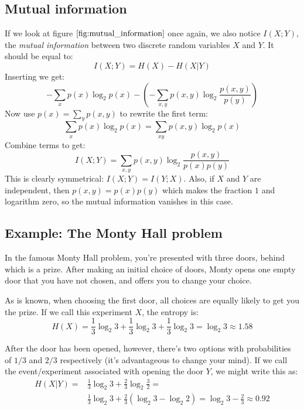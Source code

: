 \documentclass[12pt, a4paper]{article}
\numberwithin{equation}{section}
\begin{document}
\subsection{Mutual information}
If we look at figure $\ref{fig:mutual_information}$ once again, we also notice $I(X;Y)$, the \textit{mutual information} between two discrete random variables $X$ and $Y$. It should be equal to:
\begin{equation}
I(X;Y)=H(X)-H(X|Y)
\end{equation}
Inserting we get:
\begin{equation}
-\sum_x p(x)\log_2 p(x)-\left(-\sum_{x,y}p(x,y)\log_2\frac{p(x,y)}{p(y)}\right)
\end{equation}
Now use $p(x)=\sum_y p(x,y)$ to rewrite the first term:
\begin{equation}
\sum_x p(x)\log_2 p(x)=\sum_{xy}p(x,y)\log_2 p(x)
\end{equation}
Combine terms to get:
\begin{equation}
\label{mutual_information}
I(X;Y)=\sum_{x,y}p(x,y)\log_2\frac{p(x,y)}{p(x)p(y)}
\end{equation}
This is clearly symmetrical: $I(X;Y)=I(Y;X)$. Also, if $X$ and $Y$ are independent, then $p(x,y)=p(x)p(y)$ which makes the fraction $1$ and logarithm zero, so the mutual information vanishes in this case.

\subsection{Example: The Monty Hall problem}
In the famous Monty Hall problem, you're presented with three doors, behind which is a prize. After making an initial choice of doors, Monty opens one empty door that you have not chosen, and offers you to change your choice.

As is known, when choosing the first door, all choices are equally likely to get you the prize. If we call this experiment $X$, the entropy is:
\begin{equation}
H(X)=\frac{1}{3}\log_2 3+\frac{1}{3}\log_2 3+\frac{1}{3}\log_2 3=\log_2 3\approx 1.58
\end{equation}

After the door has been opened, however, there's two options with probabilities of $1/3$ and $2/3$ respectively (it's advantageous to change your mind). If we call the event/experiment associated with opening the door $Y$, we might write this as:
\begin{align}
H(X|Y)=&\frac{1}{3}\log_2 3+\frac{2}{3}\log_2\frac{3}{2}=\\
&\frac{1}{3}\log_2 3+\frac{2}{3}(\log_2 3-\log_2 2)=\log_2 3-\frac{2}{3}\approx 0.92
\end{align}
\end{document}
